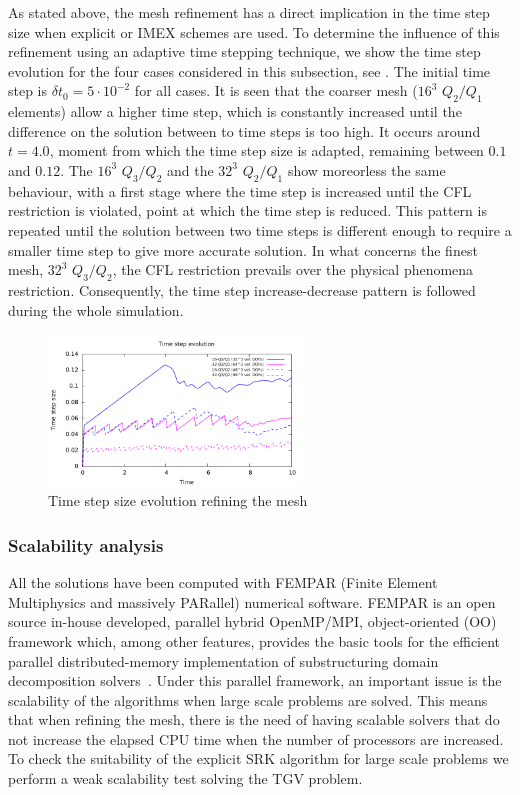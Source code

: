 As stated above, the mesh refinement has a direct implication in the time step size when explicit or IMEX schemes are used. To determine the influence of this refinement using an adaptive time stepping technique, we show the time step evolution for the four cases considered in this subsection, see . The initial time step is $ \delta t_0=5\cdot10^{-2} $ for all cases. It is seen that the coarser mesh ($ 16^3 $ $ Q_2/Q_1 $ elements) allow a higher time step, which is constantly increased until the difference on the solution between to time steps is too high. It occurs around $ t=4.0 $, moment from which the time step size is adapted, remaining between $ 0.1 $ and $ 0.12 $. The $ 16^3 $ $ Q_3/Q_2 $ and the $ 32^3 $ $ Q_2/Q_1 $ show moreorless the same behaviour, with a first stage where the time step is increased until the CFL restriction is violated, point at which the time step is reduced. This pattern is repeated until the solution between two time steps is different enough to require a smaller time step to give more accurate solution. In what concerns the finest mesh, $ 32^3 $ $ Q_3/Q_2 $, the CFL restriction prevails over the physical phenomena restriction. Consequently, the time step increase-decrease pattern is followed during the whole simulation.
\begin{figure}[h!]
  \centering
  \includegraphics[width=0.6\textwidth]{Figures/Chapter7/TGV/refinement_dtime}
  \caption{Time step size evolution refining the mesh}
  \label{fig-TGV_SRK_tim}
\end{figure}

\subsubsection{Scalability analysis}
All the solutions have been computed with FEMPAR (Finite Element Multiphysics and massively PARallel) numerical software. FEMPAR is an open source in-house developed, parallel hybrid OpenMP/MPI, object-oriented (OO) framework which, among other features, provides the basic tools for the efficient parallel distributed-memory implementation  of substructuring domain decomposition solvers~\cite{badia_implementation_2013,art003}. Under this parallel framework, an important issue is the scalability of the algorithms when large scale problems are solved. This means that when refining the mesh, there is the need of having scalable solvers that do not increase the elapsed CPU time when the number of processors are increased. To check the suitability of the explicit SRK algorithm for large scale problems we perform a weak scalability test solving the TGV problem. 

